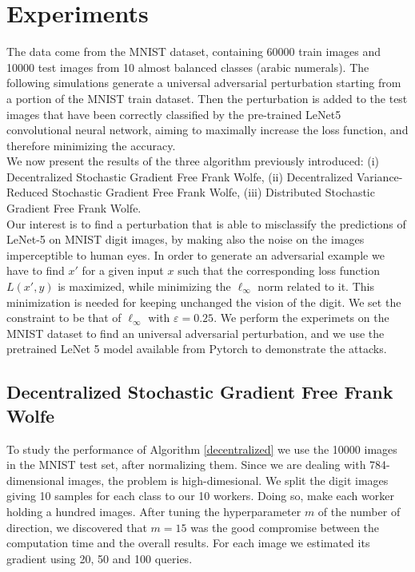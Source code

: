\section{Experiments}
The data come from the MNIST dataset, containing 60000 train images and 10000 test images from 10 almost balanced classes (arabic numerals). The following simulations generate a universal adversarial perturbation starting from a portion of the MNIST train dataset. Then the perturbation is added to the test images that have been correctly classified by the pre-trained LeNet5 convolutional neural network, aiming to maximally increase the loss function, and therefore minimizing the accuracy.\\
We now present the results of the three algorithm previously introduced: (i) Decentralized Stochastic Gradient Free Frank Wolfe, (ii) Decentralized Variance-Reduced Stochastic Gradient Free Frank Wolfe, (iii) Distributed Stochastic Gradient Free Frank Wolfe.\\
Our interest is to find a perturbation that is able to misclassify the predictions of LeNet-5 on MNIST digit images, by making also the noise on the images imperceptible to human eyes. In order to generate an adversarial example we have to find $x'$ for a given input $x$ such that the corresponding loss function $L(x',y)$ is maximized, while minimizing the $\ell_{\infty}$ norm related to it. This minimization is needed for keeping unchanged the vision of the digit. We set the constraint to be that of $\ell_{\infty}$ with $\varepsilon=0.25$. We perform the experimets on the MNIST dataset to find an universal adversarial perturbation, and we use the pretrained LeNet 5 model available from Pytorch to demonstrate the attacks.

\subsection{Decentralized Stochastic Gradient Free Frank Wolfe}
To study the performance of Algorithm \ref{decentralized} we use the 10000 images in the MNIST test set, after normalizing them. Since we are dealing with 784-dimensional images, the problem is high-dimesional. We split the digit images giving 10 samples for each class to our 10 workers. Doing so, make each worker holding a hundred images. After tuning the hyperparameter $m$ of the number of direction, we discovered that $m=15$ was the good compromise between the computation time and the overall results. For each image we estimated its gradient using 20, 50 and 100 queries.

